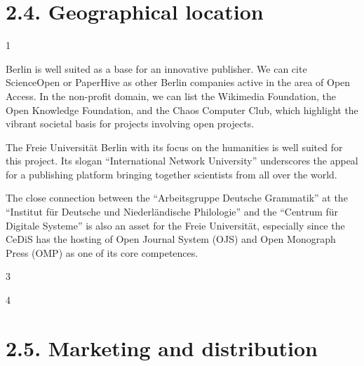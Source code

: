 \documentclass[output=guidelines,draftmode]{langscibook}
\newcommand{\background}[1]{ 
  \vspace{5mm}
  \renewcommand{\tblslinecolour}{lsDarkBlue}
  \tblssy[red]{explore2}{Background}{#1}
}
\newcommand{\langscisolution}[1]{
  \renewcommand{\tblslinecolour}{lsLightBlue}
  \tblssy{langsci}{LangSci solution}{#1}
}
\newcommand{\evaluation}[1]{
  \renewcommand{\tblslinecolour}{lsLightOrange}
  \tblssy{receipt}{Evaluation}{#1}
}
\newcommand{\othersolutions}[1]{
  \renewcommand{\tblslinecolour}{lsDarkGreenOne}
  \tblssy{more}{Other solutions}{#1}
}
\renewcommand{\tblssy}[4][black!12]{%
  \renewcommand{\langscisymbol}{#2}\renewcommand{\tblsboxcolor}{#1}
  \begin{mdframed}[style=yellowexercise,frametitle={#3}]
    #4
  \end{mdframed}
}
\begin{document}
\section{2.4. Geographical location}

\background{1}
\langscisolution{
Berlin is well suited as a base for an innovative publisher. We can cite ScienceOpen or PaperHive as other Berlin companies active in the area of Open Access. In the non-profit domain, we can list the Wikimedia Foundation, the Open Knowledge Foundation, and the Chaos Computer Club, which highlight the vibrant societal basis for projects involving open projects. 

The Freie Universität Berlin with its focus on the humanities is well suited for this project. Its slogan ``International Network University'' underscores the appeal for a publishing platform bringing together scientists from all over the world. 

The close connection between the ``Arbeitsgruppe Deutsche Grammatik'' at the ``Institut für Deutsche und Niederländische Philologie'' and the ``Centrum für Digitale Systeme'' is also an asset for the Freie Universität, especially since the CeDiS has the hosting of Open Journal System (OJS) and Open Monograph Press (OMP) as one of its core competences.
}
\evaluation{3}
\othersolutions{4}
 

\section{2.5. Marketing and distribution}
\end{document}
